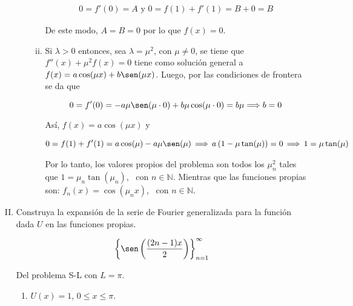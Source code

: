 \documentclass[fleqn]{article}
\newcommand{\nat}{\mathbb{N}}
\begin{document}
\begin{enumerate}[I.]
\begin{enumerate}
\begin{enumerate}[i)]
				\begin{align*}
					0 = f'(0) = A \mbox{ y } 0 = f(1) + f'(1) = B + 0 = B
				\end{align*}

				De este modo, $ A = B = 0 $ por lo que $ f(x) = 0 $.
				
				\item Si $ \lambda > 0 $ entonces, sea $ \lambda = \mu^2 $, con $ \mu \neq 0 $, se tiene que $ f''(x) + \mu^2 f(x) = 0 $
				tiene como solución general a $ f(x) = a \cos(\mu x) + b \sen(\mu x) $. Luego, por las condiciones de frontera se da que
				
				\begin{equation*}
					0 = f'(0) = -a \mu \sen(\mu \cdot 0) + b \mu \cos(\mu \cdot 0) = b \mu \Longrightarrow b = 0
				\end{equation*}

				Así, $ f(x) = a \cos(\mu x) $ y 

				\begin{align*}
					0 = f(1) + f'(1) = a \cos(\mu) - a \mu \sen(\mu) \, \Longrightarrow \, a \left( 1 - \mu \tan(\mu) \right) = 0 \, \Longrightarrow \, 1 = \mu \tan (\mu)
				\end{align*}
				
				Por lo tanto, los valores propios del problema son todos los $ \mu_n^2 $ tales que $ 1 = \mu_n \tan (\mu_n) $, \, con $ n \in \nat $. Mientras que las funciones propias son: $ f_n (x) = \cos(\mu_n x) $, \, con $ n \in \nat $.
			\end{enumerate}
			
		\end{enumerate} \vspace{3mm}

		
		\bfseries
			
		\item Construya la expansión de la serie de Fourier generalizada para la función dada $U$ en las funciones propias.
		
		\begin{equation*}
			\left\lbrace \sen \left( \dfrac{(2n - 1) x}{2} \right) \right\rbrace_{n=1}^{\infty}
		\end{equation*}

		Del problema S-L con $ L = \pi $.
		
		\begin{enumerate}
			\item $ U(x) = 1 $, $ 0 \leq x \leq \pi $.
			

\end{enumerate}
\end{enumerate}
\end{document}

